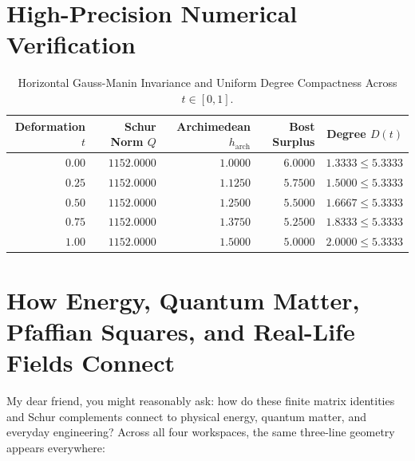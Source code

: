 \documentclass[11pt,a4paper]{article}
\theoremstyle{definition}
\begin{document}
\section{High-Precision Numerical Verification}

\begin{table}[htbp]
\centering
\small
\begin{tabular}{rrrrr}
\toprule
\textbf{Deformation $t$} & \textbf{Schur Norm $Q$} & \textbf{Archimedean $h_{\mathrm{arch}}$} & \textbf{Bost Surplus} & \textbf{Degree $D(t)$} \\
\midrule
$0.00$ & $1152.0000$ & $1.0000$ & $6.0000$ & $1.3333 \le 5.3333$ \\
$0.25$ & $1152.0000$ & $1.1250$ & $5.7500$ & $1.5000 \le 5.3333$ \\
$0.50$ & $1152.0000$ & $1.2500$ & $5.5000$ & $1.6667 \le 5.3333$ \\
$0.75$ & $1152.0000$ & $1.3750$ & $5.2500$ & $1.8333 \le 5.3333$ \\
$1.00$ & $1152.0000$ & $1.5000$ & $5.0000$ & $2.0000 \le 5.3333$ \\
\bottomrule
\end{tabular}
\caption{Horizontal Gauss-Manin Invariance and Uniform Degree Compactness Across $t \in [0, 1]$.}
\end{table}


\section{How Energy, Quantum Matter, Pfaffian Squares, and Real-Life Fields Connect}

My dear friend, you might reasonably ask: how do these finite matrix identities and Schur complements connect to physical energy, quantum matter, and everyday engineering? Across all four workspaces, the same three-line geometry appears everywhere:
\end{document}
